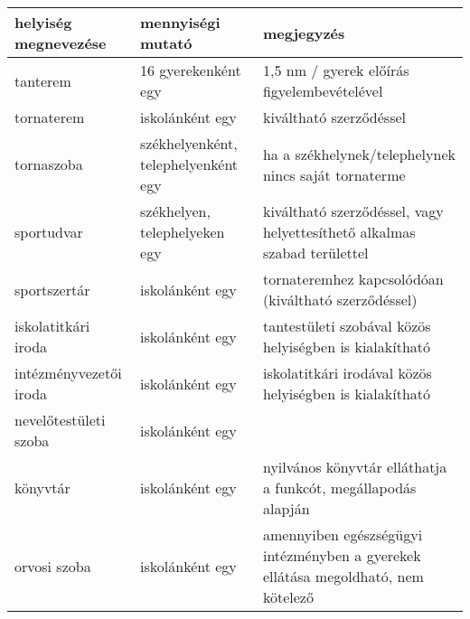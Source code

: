 \begin{table}[thb]

\begin{center}
\begin{tabular}{@{}p{4cm}|p{4cm}|p{6cm}@{}}

\textbf{helyiség megnevezése}   & \textbf{mennyiségi mutató}                       & \textbf{megjegyzés}                                                                                      \\ \hline
tanterem               & 16 gyerekenként egy                       & 1,5 nm / gyerek előírás figyelembevételével                                                    \\ \hline
tornaterem             & iskolánként egy                           & kiváltható szerződéssel                                                                         \\ \hline
tornaszoba             & székhelyenként, telephelyenként egy       & ha a székhelynek/telephelynek nincs saját tornaterme                                            \\ \hline
sportudvar             & székhelyen, telephelyeken egy             & kiváltható szerződéssel, vagy helyettesíthető alkalmas szabad területtel                        \\ \hline
sportszertár           & iskolánként egy                           & tornateremhez kapcsolódóan (kiváltható szerződéssel)                                            \\ \hline
iskolatitkári iroda    & iskolánként egy                           & tantestületi szobával közös helyiségben  is kialakítható                                        \\ \hline
intézményvezetői iroda & iskolánként egy                           & iskolatitkári irodával közös helyiségben is kialakítható                                        \\ \hline
nevelőtestületi szoba  & iskolánként egy                           &                                                                                                 \\ \hline
könyvtár               & iskolánként egy                           & nyilvános könyvtár elláthatja a funkcót, megállapodás alapján                                   \\ \hline
orvosi szoba           & iskolánként egy                           & amennyiben egészségügyi intézményben a gyerekek ellátása megoldható, nem kötelező    \\ \hline

\end{tabular}
\end{center}
\end{table}
